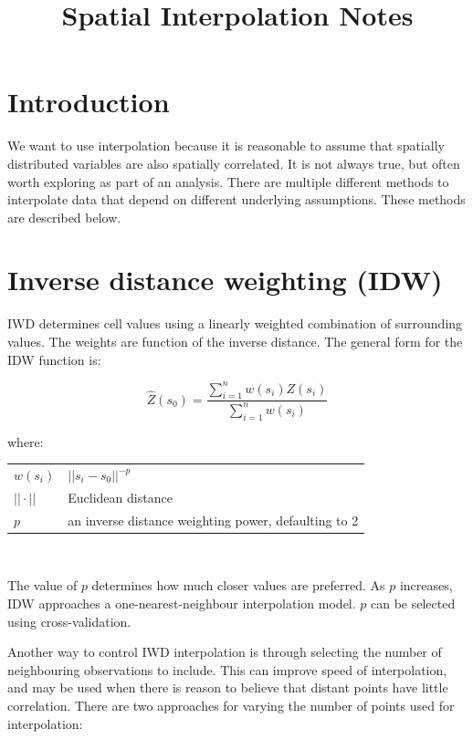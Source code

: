 \documentclass{article}
\title{Spatial Interpolation Notes}
\makeatletter
\newenvironment{conditions}[1][where:] 
  {#1 \begin{tabular}[t]{>{$}l<{$} @{${}={}$} l}}
  {\end{tabular}\\[\belowdisplayskip]}
\makeatother
\begin{document}
\maketitle

\section{Introduction}

We want to use interpolation because it is reasonable to assume that spatially distributed variables are also spatially correlated.
It is not always true, but often worth exploring as part of an analysis.
There are multiple different methods to interpolate data that depend on different underlying assumptions.
These methods are described below.

\begin{center}
\end{center}

\section{Inverse distance weighting (IDW)}

IWD determines cell values using a linearly weighted combination of surrounding values.
The weights are function of the inverse distance.
The general form for the IDW function is:

\[\hat{Z}(s_{0})= \frac{\sum_{i=1}^{n} w (s_{i}) Z (s_{i})}{\sum_{i=1}^{n} w (s_{i})}\]

\begin{conditions}
    w(s_{i}) & $||s_{i} - s_{0}||^{-p}$ \\
    || \cdot || & Euclidean distance \\
    p & an inverse distance weighting power, defaulting to 2
\end{conditions}

The value of $p$ determines how much closer values are preferred.
As $p$ increases, IDW approaches a one-nearest-neighbour interpolation model.
$p$ can be selected using cross-validation.

Another way to control IWD interpolation is through selecting the number of neighbouring observations to include.
This can improve speed of interpolation, and may be used when there is reason to believe that distant points have little correlation.
There are two approaches for varying the number of points used for interpolation:
\end{document}
